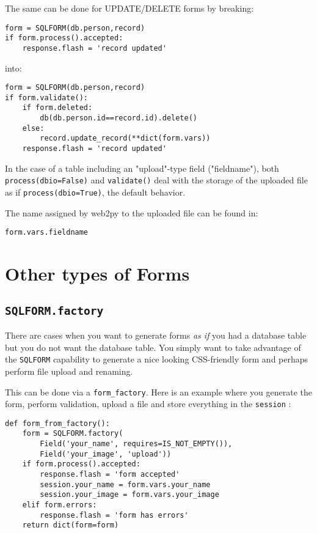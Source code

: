 \documentclass[justified,sixbynine,notoc]{tufte-book}
\def\ft{\small\tt}
\begin{document}
\begin{fullwidth}
The same can be done for UPDATE/DELETE forms by breaking:
\begin{lstlisting}
form = SQLFORM(db.person,record)
if form.process().accepted:
    response.flash = 'record updated'
\end{lstlisting}
\noindent into:
\begin{lstlisting}
form = SQLFORM(db.person,record)
if form.validate():
    if form.deleted:
        db(db.person.id==record.id).delete()
    else:
        record.update_record(**dict(form.vars))
    response.flash = 'record updated'
\end{lstlisting}

In the case of a table including an "upload"-type field ("fieldname"), both {\ft process(dbio=False)} and {\ft validate()} deal with the storage of the uploaded file as if {\ft process(dbio=True)}, the default behavior.

The name assigned by web2py to the uploaded file can be found in:
\begin{lstlisting}
form.vars.fieldname
\end{lstlisting}

\goodbreak\section{Other types of Forms}

\goodbreak\subsection{{\ft SQLFORM.factory}}

There are cases when you want to generate forms {\it as if} you had a database table but you do not want the database table. You simply want to take advantage of the {\ft SQLFORM} capability to generate a nice looking CSS-friendly form and perhaps perform file upload and renaming.

This can be done via a {\ft form\_factory}. Here is an example where you generate the form, perform validation, upload a file and store everything in the {\ft session} :
\begin{lstlisting}
def form_from_factory():
    form = SQLFORM.factory(
        Field('your_name', requires=IS_NOT_EMPTY()),
        Field('your_image', 'upload'))
    if form.process().accepted:
        response.flash = 'form accepted'
        session.your_name = form.vars.your_name
        session.your_image = form.vars.your_image
    elif form.errors:
        response.flash = 'form has errors'
    return dict(form=form)
\end{lstlisting}


\end{fullwidth}
\end{document}

